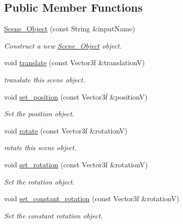 \subsection*{Public Member Functions}
\begin{DoxyCompactItemize}
\item 
\mbox{\hyperlink{classprzurro_1_1_scene___object_ad67d8974378a4eedea6027cb750eed4d}{Scene\+\_\+\+Object}} (const String \&input\+Name)
\begin{DoxyCompactList}\small\item\em Construct a new \mbox{\hyperlink{classprzurro_1_1_scene___object}{Scene\+\_\+\+Object}} object. \end{DoxyCompactList}\item 
void \mbox{\hyperlink{classprzurro_1_1_scene___object_ac09d33f77a144de396414f36fb11f901}{translate}} (const Vector3f \&translationV)
\begin{DoxyCompactList}\small\item\em translate this scene object. \end{DoxyCompactList}\item 
void \mbox{\hyperlink{classprzurro_1_1_scene___object_adfb1f8a52324f4618474a89da64b65d6}{set\+\_\+position}} (const Vector3f \&positionV)
\begin{DoxyCompactList}\small\item\em Set the position object. \end{DoxyCompactList}\item 
void \mbox{\hyperlink{classprzurro_1_1_scene___object_a417701b484844d3eaeba812c90a2821d}{rotate}} (const Vector3f \&rotationV)
\begin{DoxyCompactList}\small\item\em rotate this scene object. \end{DoxyCompactList}\item 
void \mbox{\hyperlink{classprzurro_1_1_scene___object_afda0a69deccf91508a1781418d2c3497}{set\+\_\+rotation}} (const Vector3f \&rotationV)
\begin{DoxyCompactList}\small\item\em Set the rotation object. \end{DoxyCompactList}\item 
void \mbox{\hyperlink{classprzurro_1_1_scene___object_acbc820f987203bc0d635b4e1d0d3b3ac}{set\+\_\+constant\+\_\+rotation}} (const Vector3f \&rotationV)
\begin{DoxyCompactList}\small\item\em Set the constant rotation object. \end{DoxyCompactList}\item 

\end{DoxyCompactItemize}
